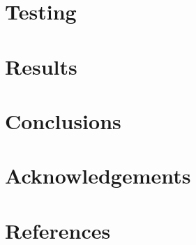 \documentclass[review]{elsarticle}
\begin{document}
\section{Testing}


\section{Results}

\section{Conclusions}

\section{Acknowledgements}

\section*{References}


\end{document}
